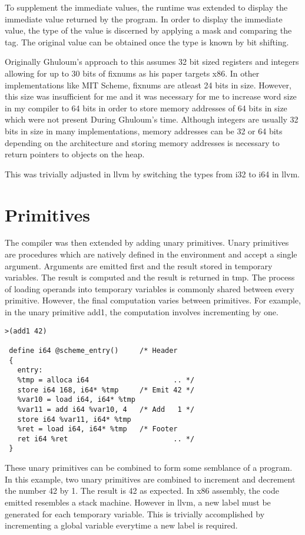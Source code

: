 \documentclass{article}
\begin{document}
To supplement the immediate values, the runtime was extended to display the immediate value returned by the program. In order to display the immediate value, the type of the value is discerned by applying a mask and comparing the tag. The original value can be obtained once the type is known by bit shifting.

Originally Ghuloum's approach to this assumes 32 bit sized registers and integers allowing for up to 30 bits of fixnums as his paper targets x86. In other implementations like MIT Scheme, fixnums are atleast 24 bits in size. However, this size was insufficient for me and it was necessary for me to increase word size in my compiler to 64 bits in order to store memory addresses of 64 bits in size which were not present During Ghuloum's time. Although integers are usually 32 bits in size in many implementations, memory addresses can be 32 or 64 bits depending on the architecture and storing memory addresses is necessary to return pointers to objects on the heap.

This was trivially adjusted in llvm by switching the types from i32 to i64 in llvm.

\section{Primitives}

The compiler was then extended by adding unary primitives. Unary primitives are procedures which are natively defined in the environment and accept a single argument. Arguments are emitted first and the result stored in temporary variables. The result is computed and the result is returned in tmp. The process of loading operands into temporary variables is commonly shared between every primitive. However, the final computation varies between primitives. For example, in the unary primitive add1, the computation involves incrementing by one.

\begin{verbatim}
>(add1 42)

 define i64 @scheme_entry()     /* Header
 {
   entry:
   %tmp = alloca i64                    .. */
   store i64 168, i64* %tmp     /* Emit 42 */ 
   %var10 = load i64, i64* %tmp 
   %var11 = add i64 %var10, 4   /* Add   1 */
   store i64 %var11, i64* %tmp  
   %ret = load i64, i64* %tmp   /* Footer 
   ret i64 %ret                         .. */
 }
\end{verbatim}

These unary primitives can be combined to form some semblance of a program. In this example, two unary primitives are combined to increment and decrement the number 42 by 1. The result is 42 as expected. In x86 assembly, the code emitted resembles a stack machine. However in llvm, a new label must be generated for each temporary variable. This is trivially accomplished by incrementing a global variable everytime a new label is required.
\end{document}
